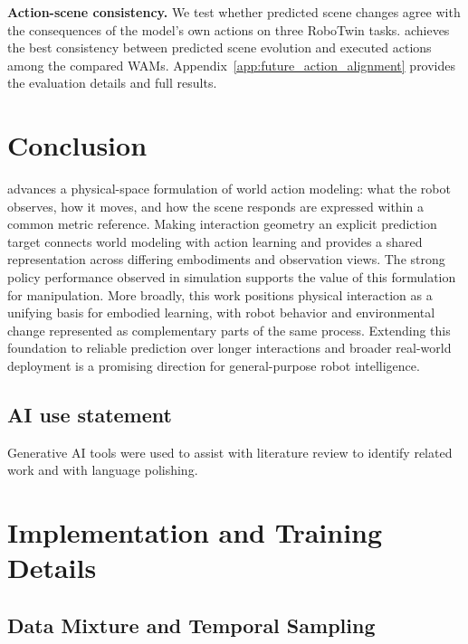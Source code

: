 \noindent\textbf{Action-scene consistency.}
We test whether predicted scene changes agree with the consequences of
the model's own actions on three RoboTwin tasks. \method{} achieves the
best consistency between predicted scene evolution and executed actions
among the compared WAMs. Appendix~\ref{app:future_action_alignment}
provides the evaluation details and full results.

\vspace{-0.3cm}
\section{Conclusion}
\label{sec:conclusion}
\vspace{-0.2cm}

\method{} advances a physical-space formulation of world action modeling:
what the robot observes, how it moves, and how the scene responds are expressed
within a common metric reference. Making interaction geometry an explicit
prediction target connects world modeling with action learning and provides
a shared representation across differing embodiments and observation views.
The strong policy performance observed in simulation supports the value of
this formulation for manipulation. More broadly, this work positions
physical interaction as a unifying basis for embodied learning, with robot
behavior and environmental change represented as complementary parts of the
same process. Extending this foundation to reliable prediction over longer
interactions and broader real-world deployment is a promising direction
for general-purpose robot intelligence.

\subsection*{AI use statement}
Generative AI tools were used to assist with literature review to identify related work and with language polishing.

\clearpage
\appendix
\providecommand{\method}{Unitas}
\raggedbottom

\section{Implementation and Training Details}
\label{app:experiments}
\label{app:experiments:data}

\subsection{Data Mixture and Temporal Sampling}
\label{app:temporal_sampling}
\label{app:dataset_visualization}

